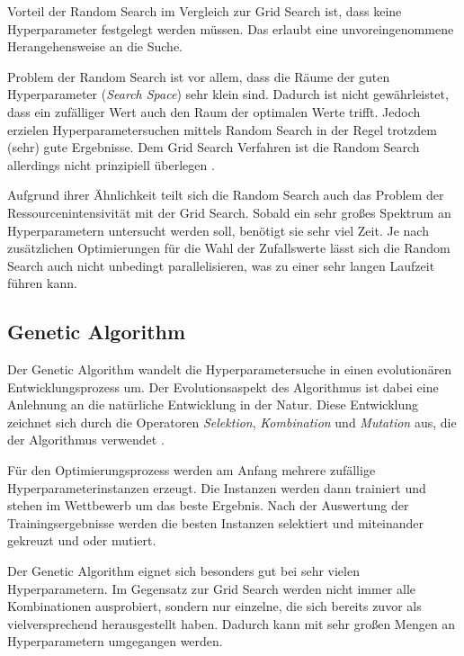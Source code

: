 Vorteil der Random Search im Vergleich zur Grid Search ist, dass keine Hyperparameter festgelegt werden müssen.
Das erlaubt eine unvoreingenommene Herangehensweise an die Suche.

Problem der Random Search ist vor allem, dass die Räume der guten Hyperparameter (\textit{Search Space}) sehr klein sind.
Dadurch ist nicht gewährleistet, dass ein zufälliger Wert auch den Raum der optimalen Werte trifft.
Jedoch erzielen Hyperparametersuchen mittels Random Search in der Regel trotzdem (sehr) gute Ergebnisse.
Dem Grid Search Verfahren ist die Random Search allerdings nicht prinzipiell überlegen \cite{hyperparameters-random-search}.

Aufgrund ihrer Ähnlichkeit teilt sich die Random Search auch das Problem der Ressourcenintensivität mit der Grid Search.
Sobald ein sehr großes Spektrum an Hyperparametern untersucht werden soll, benötigt sie sehr viel Zeit.
Je nach zusätzlichen Optimierungen für die Wahl der Zufallswerte lässt sich die Random Search auch nicht unbedingt parallelisieren, was zu einer sehr langen Laufzeit führen kann.

\subsection{Genetic Algorithm}
Der Genetic Algorithm wandelt die Hyperparametersuche in einen evolutionären Entwicklungsprozess um.
Der Evolutionsaspekt des Algorithmus ist dabei eine Anlehnung an die natürliche Entwicklung in der Natur.
Diese Entwicklung zeichnet sich durch die Operatoren \textit{Selektion}, \textit{Kombination} und \textit{Mutation} aus, die der Algorithmus verwendet \cite{hyperparameters-genetic-algorithm}.
\newline

Für den Optimierungsprozess werden am Anfang mehrere zufällige Hyperparameterinstanzen erzeugt.
Die Instanzen werden dann trainiert und stehen im Wettbewerb um das beste Ergebnis.
Nach der Auswertung der Trainingsergebnisse werden die besten Instanzen selektiert und miteinander gekreuzt und oder mutiert.
\newline

Der Genetic Algorithm eignet sich besonders gut bei sehr vielen Hyperparametern.
Im Gegensatz zur Grid Search werden nicht immer alle Kombinationen ausprobiert, sondern nur einzelne, die sich bereits zuvor als vielversprechend herausgestellt haben.
Dadurch kann mit sehr großen Mengen an Hyperparametern umgegangen werden.

